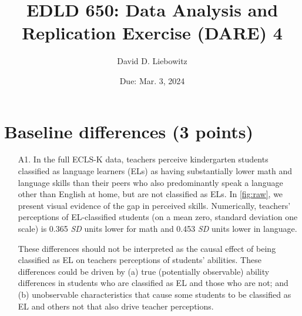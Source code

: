 \documentclass[a4paper, 11pt]{article}
\title{EDLD 650: Data Analysis and Replication Exercise (DARE) 4}
\author{David D. Liebowitz}
\date{Due: Mar. 3, 2024}
\begin{document}
\maketitle



\section{Baseline differences  (3 points)}

\begin{enumerate}
	\item[A1.] In the full ECLS-K data, teachers perceive kindergarten students classified as language learners (ELs) as having substantially lower math and language skills than their peers who also predominantly speak a language other than English at home, but are not classified as ELs. In \autoref{fig:raw}, we present visual evidence of the gap in perceived skills. Numerically, teachers' perceptions of EL-classified students (on a mean zero, standard deviation one scale) is 0.365 \textit{SD} units lower for math and 0.453 \textit{SD} units lower in language. 
	
	These differences should not be interpreted as the causal effect of being classified as EL on teachers perceptions of students' abilities. These differences could be driven by (a) true (potentially observable) ability differences in students who are classified as EL and those who are not; and (b) unobservable characteristics that cause some students to be classified as EL and others not that also drive teacher perceptions.


\end{enumerate}
\end{document}
